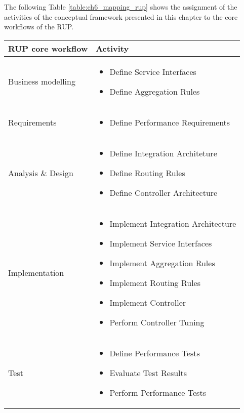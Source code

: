 The following Table \ref{table:ch6_mapping_rup} shows the assignment of the activities of the conceptual framework presented in this chapter to the core workflows of the \ac{RUP}.

	\begin{tabularx}{\textwidth}{@{} l X @{}}
		\caption{Mapping of activities to \ac{RUP} core workflows} \label{table:ch6_mapping_rup}\\
		\toprule
		\bfseries \ac{RUP} core workflow & \bfseries Activity\\
		\midrule
		Business modelling & 
		\begin{itemize}
			\item Define Service Interfaces
			\item Define Aggregation Rules
		\end{itemize}
		\\
		\midrule
		Requirements & 
		\begin{itemize}
			\item Define Performance Requirements
		\end{itemize}
		\\
		\midrule
		Analysis \& Design &
		\begin{itemize}
			\item Define Integration Architeture
			\item Define Routing Rules
			\item Define Controller Architecture
		\end{itemize}
		\\
		\midrule
		Implementation &
		\begin{itemize}
			\item Implement Integration Architecture
			\item Implement Service Interfaces
			\item Implement Aggregation Rules
			\item Implement Routing Rules
			\item Implement Controller
			\item Perform Controller Tuning
		\end{itemize}
		\\
		\midrule
		Test & 
		\begin{itemize}
			\item Define Performance Tests
			\item Evaluate Test Results
			\item Perform Performance Tests
		\end{itemize}
		\\

\end{tabularx}

